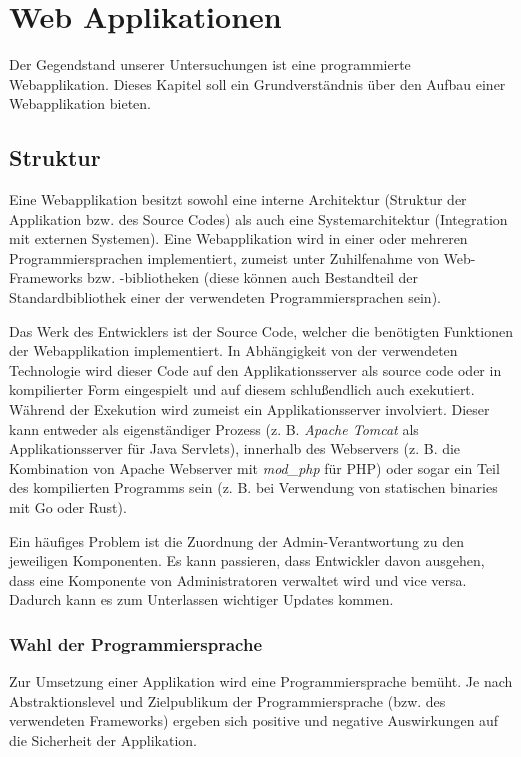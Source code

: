 \chapter{Web Applikationen}

Der Gegendstand unserer Untersuchungen ist eine programmierte Webapplikation. Dieses Kapitel soll ein Grundverständnis über den Aufbau einer Webapplikation bieten.

\section{Struktur}

Eine Webapplikation besitzt sowohl eine interne Architektur (Struktur der Applikation bzw. des Source Codes) als auch eine Systemarchitektur (Integration mit externen Systemen). Eine Webapplikation wird in einer oder mehreren Programmiersprachen implementiert, zumeist unter Zuhilfenahme von Web-Frameworks bzw. -bibliotheken (diese können auch Bestandteil der Standardbibliothek einer der verwendeten Programmiersprachen sein).

Das Werk des Entwicklers ist der Source Code, welcher die benötigten Funktionen der Webapplikation implementiert. In Abhängigkeit von der verwendeten Technologie wird dieser Code auf den Applikationsserver als source code oder in kompilierter Form eingespielt und auf diesem schlußendlich auch exekutiert. Während der Exekution wird zumeist ein Applikationsserver involviert. Dieser kann entweder als eigenständiger Prozess (z. B. \textit{Apache Tomcat} als Applikationsserver für Java Servlets), innerhalb des Webservers (z. B. die Kombination von Apache Webserver mit \textit{mod\_php} für PHP) oder sogar ein Teil des kompilierten Programms sein (z. B. bei Verwendung von statischen binaries mit Go oder Rust).

Ein häufiges Problem ist die Zuordnung der Admin-Verantwortung zu den jeweiligen Komponenten. Es kann passieren, dass Entwickler davon ausgehen, dass eine Komponente von Administratoren verwaltet wird und vice versa. Dadurch kann es zum Unterlassen wichtiger Updates kommen.

\subsection{Wahl der Programmiersprache}

Zur Umsetzung einer Applikation wird eine Programmiersprache bemüht. Je nach Abstraktionslevel und Zielpublikum der Programmiersprache (bzw. des verwendeten Frameworks) ergeben sich positive und negative Auswirkungen auf die Sicherheit der Applikation.

